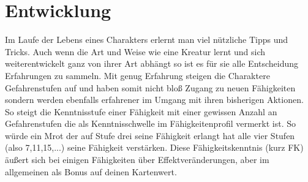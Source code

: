 \section{Entwicklung}
Im Laufe der Lebens eines Charakters erlernt man viel nützliche Tipps und Tricks. Auch wenn die Art und Weise wie eine Kreatur lernt und sich weiterentwickelt ganz von ihrer Art abhängt so ist es für sie alle Entscheidung Erfahrungen zu sammeln. Mit genug Erfahrung steigen die Charaktere Gefahrenstufen auf und haben somit nicht bloß Zugang zu neuen Fähigkeiten sondern werden ebenfalls erfahrener im Umgang mit ihren bisherigen Aktionen. So steigt die Kenntnisstufe einer Fähigkeit mit einer gewissen Anzahl an Gefahrenstufen die als Kenntnisschwelle im Fähigkeitenprofil vermerkt ist. So würde ein Mrot der auf Stufe drei seine Fähigkeit  erlangt hat alle vier Stufen (also 7,11,15,...) seine Fähigkeit verstärken. Diese Fähigkeitskenntnis (kurz FK) äußert sich bei einigen Fähigkeiten über Effektveränderungen, aber im allgemeinen als Bonus auf deinen Kartenwert.

